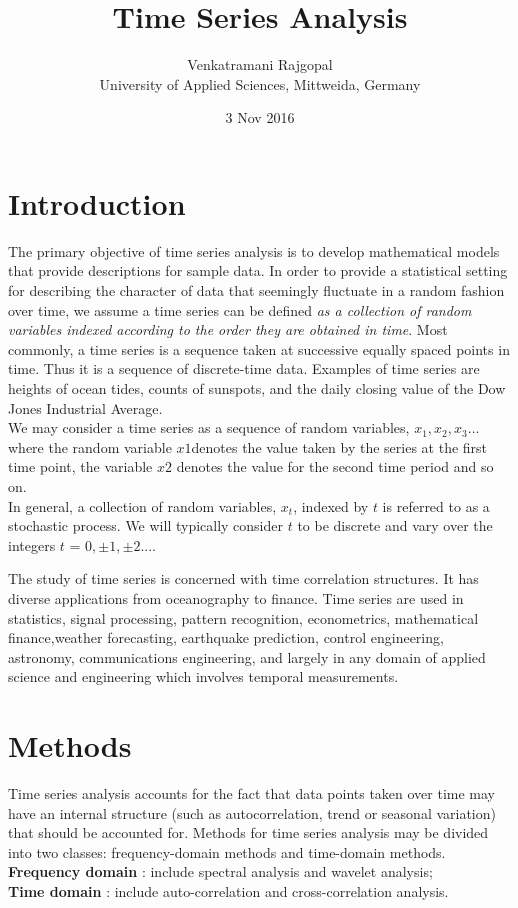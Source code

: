 \documentclass[a4paper]{article}
\title{Time Series Analysis}
\author{Venkatramani Rajgopal\\
	\normalsize{University of Applied Sciences, Mittweida, Germany}}
\date{3 Nov 2016}
\theoremstyle{definition}
\begin{document}
	\maketitle
\tableofcontents

\section{Introduction}
The primary objective of time series analysis is to develop mathematical models
that provide descriptions for sample data. In order to provide a statistical setting for describing the character of data that seemingly fluctuate in a random fashion over time,
we assume a time series can be defined \textit{as a collection of random variables indexed
according to the order they are obtained in time}. Most commonly, a time series is a sequence taken at successive equally spaced points in time. Thus it is a sequence of discrete-time data. Examples of time series are heights of ocean tides, counts of sunspots, and the daily closing value of the Dow Jones Industrial Average. \\

We may consider a time series as a sequence of random variables, $ x_1,x_2,x_3... $ where
the random variable $ x1 $denotes the value taken by the series at the first time
point, the variable $ x2 $ denotes the value for the second time period and so on.  \\

In general, a collection of random  variables, $ x_t $, indexed by $ t $ is referred to as a stochastic process. We will typically consider $ t $ to be discrete and vary over the integers $ t $ = $ 0,\pm1, \pm2... $. 

The study of time series is concerned with time correlation structures. It has diverse applications from oceanography to finance. Time series are used in statistics, signal processing, pattern recognition, econometrics, mathematical finance,weather forecasting,  earthquake prediction, control engineering, astronomy, communications engineering, and largely in any domain of applied science and engineering which involves temporal measurements.

\section{Methods}

Time series analysis accounts for the fact that data points taken over time may have an internal structure (such as autocorrelation, trend or seasonal variation) that should be accounted for.
Methods for time series analysis may be divided into two classes: frequency-domain methods and time-domain methods.\\
\textbf{Frequency domain} : include spectral analysis and wavelet analysis;\\
\textbf{Time domain }: include auto-correlation and cross-correlation analysis. 
\end{document}
